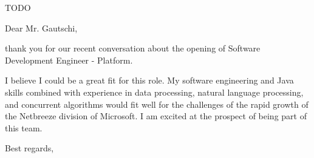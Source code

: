 \documentclass[paper=a4,fromphone=true,fromemail=true,foldmarks=false,
backaddress=false,fontsize=12pt,fromalign=left,addrfield=off,
myletter]{scrlttr2}
\begin{document}
\begin{letter}{TODO}


\opening{Dear Mr. Gautschi,}

thank you for our recent conversation about the opening of Software
Development Engineer - Platform.

I believe I could be a great fit for this role. My software
engineering and Java skills combined with experience in data
processing, natural language processing, and concurrent algorithms
would fit well for the challenges of the rapid growth of the Netbreeze
division of Microsoft. I am excited at the prospect of being part of
this team.

\closing{Best regards,}


\end{letter}
\end{document}
